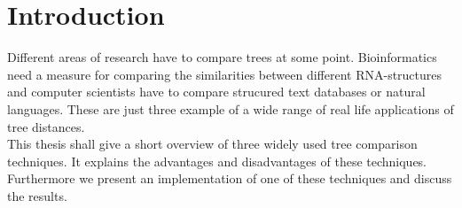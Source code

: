 \chapter{Introduction}
Different areas of research have to compare trees at some point. Bioinformatics need a measure for comparing the similarities between different RNA-structures and computer scientists have to compare strucured text databases or natural languages. These are just three example of a wide range of real life applications of tree distances.\\
This thesis shall give a short overview of three widely used tree comparison techniques. It explains the advantages and disadvantages of these techniques. Furthermore we present an implementation of one of these techniques and discuss the results. 